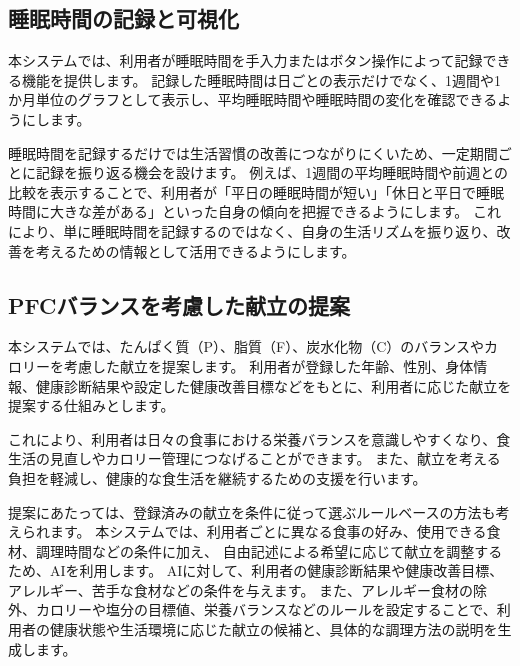 \documentclass[uplatex,dvipdfmx]{jlreq}
\begin{document}
\subsection{睡眠時間の記録と可視化}
本システムでは、利用者が睡眠時間を手入力またはボタン操作によって記録できる機能を提供します。
記録した睡眠時間は日ごとの表示だけでなく、1週間や1か月単位のグラフとして表示し、平均睡眠時間や睡眠時間の変化を確認できるようにします。

睡眠時間を記録するだけでは生活習慣の改善につながりにくいため、一定期間ごとに記録を振り返る機会を設けます。
例えば、1週間の平均睡眠時間や前週との比較を表示することで、利用者が「平日の睡眠時間が短い」「休日と平日で睡眠時間に大きな差がある」といった自身の傾向を把握できるようにします。
これにより、単に睡眠時間を記録するのではなく、自身の生活リズムを振り返り、改善を考えるための情報として活用できるようにします。


\subsection{PFCバランスを考慮した献立の提案}
本システムでは、たんぱく質（P）、脂質（F）、炭水化物（C）のバランスやカロリーを考慮した献立を提案します。
利用者が登録した年齢、性別、身体情報、健康診断結果や設定した健康改善目標などをもとに、利用者に応じた献立を提案する仕組みとします。

これにより、利用者は日々の食事における栄養バランスを意識しやすくなり、食生活の見直しやカロリー管理につなげることができます。
また、献立を考える負担を軽減し、健康的な食生活を継続するための支援を行います。

提案にあたっては、登録済みの献立を条件に従って選ぶルールベースの方法も考えられます。
本システムでは、利用者ごとに異なる食事の好み、使用できる食材、調理時間などの条件に加え、
自由記述による希望に応じて献立を調整するため、AIを利用します。
AIに対して、利用者の健康診断結果や健康改善目標、アレルギー、苦手な食材などの条件を与えます。
また、アレルギー食材の除外、カロリーや塩分の目標値、栄養バランスなどのルールを設定することで、利用者の健康状態や生活環境に応じた献立の候補と、具体的な調理方法の説明を生成します。
\end{document}
